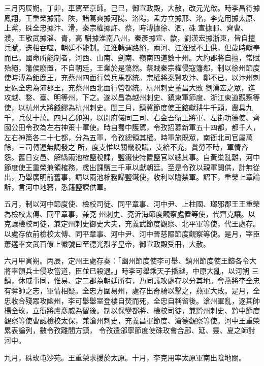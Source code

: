 \begin{pinyinscope}
 三月丙辰朔。丁卯，車駕至京師。己巳，御宣政殿，大赦，改元光啟。時李昌符據鳳翔，王重榮據蒲、陜，諸葛爽據河陽、洛陽，孟方立據邢、洺，李克用據太原、上黨，硃全忠據汴、滑，秦宗權據許、蔡，時溥據徐、泗，硃宣據鄆、齊曹、濮，王敬武據淄、青，高
 駢據淮南八州，秦彥據宣、歙，劉漢宏據浙東，皆自擅兵賦，迭相吞噬，朝廷不能制。江淮轉運路絕，兩河、江淮賦不上供，但歲時獻奉而已。國命所能制者，河西、山南、劍南、嶺南四道數十州。大約郡將自擅，常賦殆絕，籓侯廢置，不自朝廷，王業於是蕩然。蔡賊秦宗權侵寇籓鄰，制以徐州節度使時溥為鉅鹿王，充蔡州四面行營兵馬都統。宗權將秦賢攻汴、鄭不已，以汴州刺史硃全忠為沛郡王，充蔡州西北面行營都統。杭州刺史董昌大敗
 劉漢宏之眾，進攻越、婺、臺、明等州，下之。遂以昌為越州刺史、鎮東軍節度、浙江東道觀察等使，以杭州大將錢鏐為杭州刺史。閏三月，鎮冀節度使王鎔獻耕牛千頭，農具九千，兵仗十萬。四月乙卯朔，以開府儀同三司、右金吾衛上將軍、左街功德使、齊國公田令孜為左右神策十軍使。時自蜀中護駕，令孜招募新軍五十四都，都千人，左右神策各二十七都，分為五軍，令孜總領其權。時軍旅既眾，南衙北司官屬萬餘，三司轉運無調發之
 所，度支惟以關畿稅賦，支給不充，賞勞不時，軍情咨怨。舊日安邑、解縣兩池榷鹽稅課，鹽鐵使特置鹽官以總其事。自黃巢亂離，河中節度使王重榮兼領榷務，歲出課鹽三千車以獻朝廷。至是令孜以親軍闕供，計無從出，乃舉廣明前舊事，請以兩池榷務歸鹽鐵使，收利以贍禁軍。詔下，重榮上章論訴，言河中地窘，悉籍鹽課供軍。



 五月，制以河中節度使、檢校司徒、同平章事、河中尹、上柱國、瑯邪郡王王重榮為檢校太傅、同平章事，兼兗
 州刺史、兗沂海節度觀察處置等使，代齊克讓。以克讓檢校司徒，兼定州刺史御史大夫，充義武節度觀察、北平軍等使，代王處存。以處存依前檢校太傅、同平章事、河中尹、河中晉慈隰節度觀察等使。是月，宰臣蕭遘率文武百僚上徽號曰至德光烈孝皇帝，御宣政殿受冊，大赦。



 六月甲寅朔。丙辰，定州王處存奏：「幽州節度使李可舉、鎮州節度使王鎔各令大將率領兵士侵攻當道，臣並已殺退。」時李可舉乘天子播越，中原大亂，以河朔
 三鎮，休戚事同，惟易、定二郡為朝廷所有，乃同議攻處存以分其地。會燕將李全忠有奪帥之志，軍情相疑。全忠方圍易州，處存出奇騎以擊之，燕軍大敗。是月，全忠收合殘眾攻幽州，李可舉舉室登樓自焚而死，全忠自稱留後。滄州軍亂，逐其帥楊全玫，立衙將盧彥威為留後。制以保鑾都將、檢校司徒，兼黔州刺史、黔中節度觀察等使曹誠檢校太保，兼滄州刺史，充義昌軍節度、滄德觀察等使。河中王重榮累表論列，數令孜離間方鎮，
 令孜遣邠寧節度使硃玫會合鄜、延、靈、夏之師討河中。



 九月，硃玫屯沙苑。王重榮求援於太原。十月，李克用率太原軍南出陰地關。




\end{pinyinscope}
